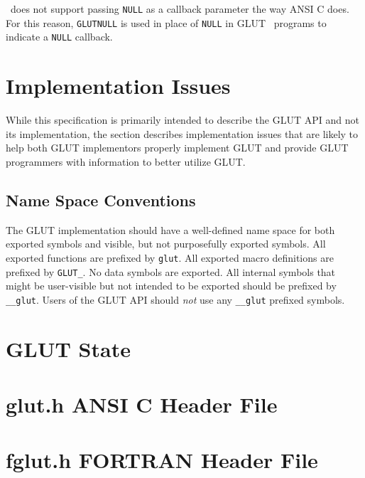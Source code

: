 \Fortran\ does not support passing {\tt NULL} as a callback
parameter the way ANSI C does.  For this reason, {\tt GLUTNULL}
is used in place of {\tt NULL} in GLUT \Fortran\ programs to
indicate a {\tt NULL} callback.

\section{Implementation Issues}

While this specification is primarily intended to describe the GLUT API
and not its implementation, the section describes implementation
issues that are likely to help both GLUT implementors properly
implement GLUT and provide GLUT programmers with information to better
utilize GLUT.

\subsection{Name Space Conventions}

The GLUT implementation should have a well-defined name space for both
exported symbols and visible, but not purposefully exported symbols.
All exported functions are prefixed by {\tt glut}.  All exported macro
definitions are prefixed by {\tt GLUT\_}.  No data symbols are
exported.  All internal symbols that might be user-visible but not
intended to be exported should be prefixed by {\tt \_\_glut}.  Users of
the GLUT API should {\em not} use any {\tt \_\_glut} prefixed symbols.

\newpage

\appendix


\section{GLUT State}



\section{glut.h ANSI C Header File}

{\footnotesize
{}
}

\section{fglut.h FORTRAN Header File}

